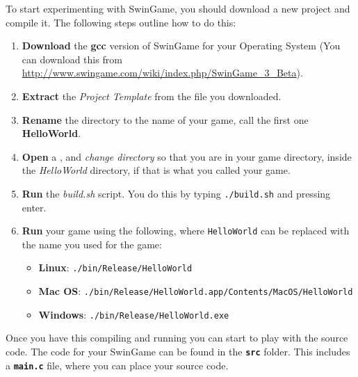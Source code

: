 To start experimenting with SwinGame, you should download a new project and compile it. The following steps outline how to do this:
\begin{enumerate}
  \item \textbf{Download} the \textbf{gcc} version of SwinGame for your Operating System (You can download this from \url{http://www.swingame.com/wiki/index.php/SwinGame_3_Beta}). 
  \item \textbf{Extract} the \emph{Project Template} from the file you downloaded.
  \item \textbf{Rename} the directory to the name of your game, call the first one \textbf{HelloWorld}.
  \item \textbf{Open} a , and \emph{change directory} so that you are in your game directory, inside the \emph{HelloWorld} directory, if that is what you called your game.
  \item \textbf{Run} the \emph{build.sh} script. You do this by typing \texttt{./build.sh} and pressing enter.
  \item \textbf{Run} your game using the following, where \texttt{HelloWorld} can be replaced with the name you used for the game:
  \begin{itemize}
    \item \textbf{Linux}: \texttt{./bin/Release/HelloWorld}
    \item \textbf{Mac OS}: \texttt{./bin/Release/HelloWorld.app/Contents/MacOS/HelloWorld}
    \item \textbf{Windows}: \texttt{./bin/Release/HelloWorld.exe}
  \end{itemize}
\end{enumerate}

Once you have this compiling and running you can start to play with the source code. The code for your SwinGame can be found in the \textbf{\texttt{src}} folder. This includes a \texttt{\textbf{main.c}} file, where you can place your source code.


